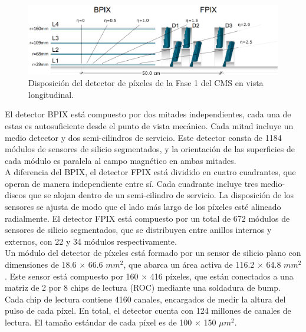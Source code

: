 \begin{center}
  \begin{figure}[h]
    \centering
    \includegraphics[scale=.26]{Chapter2/phase1_PixelDetector.png}
    \caption[Fase 1 del detector de pixeles en CMS]{Disposición del detector de píxeles de la Fase 1 del CMS en vista longitudinal.}
    \label{phase1_pixel_detector}
  \end{figure}
\end{center}

El detector BPIX está compuesto por dos mitades independientes, cada una de estas es autosuficiente desde el punto de vista mecánico. Cada mitad incluye un medio detector y dos semi-cilindros de servicio. Este detector consta de 1184 módulos de sensores de silicio segmentados, y la orientación de las superficies de cada módulo es paralela al campo magnético en ambas mitades.\\

A diferencia del BPIX, el detector FPIX está dividido en cuatro cuadrantes, que operan de manera independiente entre sí. Cada cuadrante incluye tres medio-discos que se alojan dentro de un semi-cilindro de servicio. La disposición de los sensores se ajusta de modo que el lado más largo de los píxeles esté alineado radialmente. El detector FPIX está compuesto por un total de 672 módulos de sensores de silicio segmentados, que se distribuyen entre anillos internos y externos, con 22 y 34 módulos respectivamente.\\

Un módulo del detector de píxeles está formado por un sensor de silicio plano con dimensiones de 18.6 $\times$ 66.6 $mm^{2}$, que abarca un área activa de 116.2 $\times$ 64.8 $mm^{2}$. Este sensor está compuesto por 160 $\times$ 416 píxeles, que están conectados a una matriz de 2 por 8 chips de lectura (ROC) mediante una soldadura de bump. Cada chip de lectura contiene 4160 canales, encargados de medir la altura del pulso de cada píxel. En total, el detector cuenta con 124 millones de canales de lectura. El tamaño estándar de cada píxel es de 100 $\times$ 150 $\mu m^{2}$.\\

